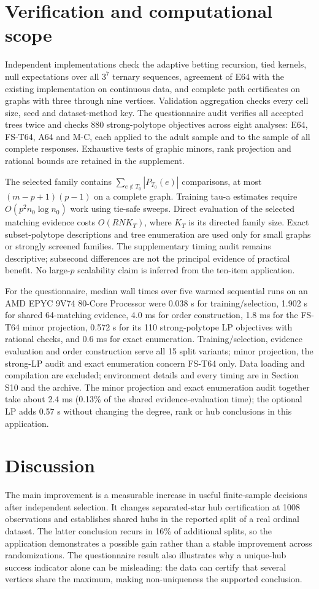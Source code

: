 \documentclass[11pt]{article}
\theoremstyle{plain}
\theoremstyle{definition}\newtheorem{remark}{Remark}\newtheorem{example}{Example}
\begin{document}
\section{Verification and computational scope}\label{sec:verification}
Independent implementations check the adaptive betting recursion, tied kernels, null expectations over all $3^7$ ternary sequences, agreement of E64 with the existing implementation on continuous data, and complete path certificates on graphs with three through nine vertices. Validation aggregation checks every cell size, seed and dataset-method key. The questionnaire audit verifies all accepted trees twice and checks 880 strong-polytope objectives across eight analyses: E64, FS-T64, A64 and M-C, each applied to the adult sample and to the sample of all complete responses. Exhaustive tests of graphic minors, rank projection and rational bounds are retained in the supplement.

The selected family contains $\sum_{e\notin T_0}|P_{T_0}(e)|$ comparisons, at most $(m-p+1)(p-1)$ on a complete graph. Training tau-a estimates require $O(p^2n_0\log n_0)$ work using tie-safe sweeps. Direct evaluation of the selected matching evidence costs $O(RN K_T)$, where $K_T$ is its directed family size. Exact subset-polytope descriptions and tree enumeration are used only for small graphs or strongly screened families. The supplementary timing audit remains descriptive; subsecond differences are not the principal evidence of practical benefit. No large-$p$ scalability claim is inferred from the ten-item application.

For the questionnaire, median wall times over five warmed sequential runs on an AMD EPYC 9V74 80-Core Processor were 0.038 s for training/selection, 1.902 s for shared 64-matching evidence, 4.0 ms for order construction, 1.8 ms for the FS-T64 minor projection, 0.572 s for its 110 strong-polytope LP objectives with rational checks, and 0.6 ms for exact enumeration. Training/selection, evidence evaluation and order construction serve all 15 split variants; minor projection, the strong-LP audit and exact enumeration concern FS-T64 only. Data loading and compilation are excluded; environment details and every timing are in Section S10 and the archive. The minor projection and exact enumeration audit together take about 2.4 ms (0.13\% of the shared evidence-evaluation time); the optional LP adds 0.57 s without changing the degree, rank or hub conclusions in this application.

\section{Discussion}
The main improvement is a measurable increase in useful finite-sample decisions after independent selection. It changes separated-star hub certification at 1008 observations and establishes shared hubs in the reported split of a real ordinal dataset. The latter conclusion recurs in 16\% of additional splits, so the application demonstrates a possible gain rather than a stable improvement across randomizations. The questionnaire result also illustrates why a unique-hub success indicator alone can be misleading: the data can certify that several vertices share the maximum, making non-uniqueness the supported conclusion.
\end{document}
